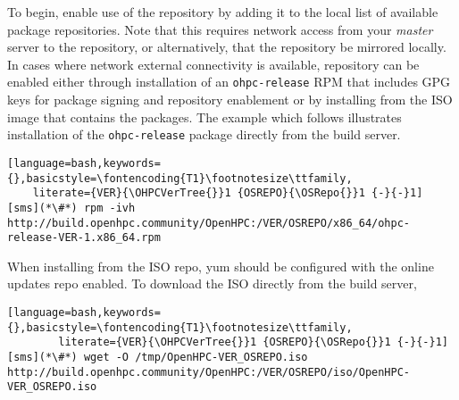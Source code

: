 To begin, enable use of the \OHPC{} repository by adding it to the local list
of available package repositories. Note that this requires network access from
your {\em master} server to the \OHPC{} repository, or alternatively, that
the \OHPC{} repository be mirrored locally.  In cases where network external
connectivity is available, \OHPC{} repository can be enabled either through
installation of an \texttt{ohpc-release} RPM that includes GPG keys for package
signing and repository enablement or by installing from the ISO image that 
contains the \OHPC{} packages.  The example which follows illustrates 
installation of the \texttt{ohpc-release} package directly from the \OHPC{}
build server.


\begin{lstlisting}[language=bash,keywords={},basicstyle=\fontencoding{T1}\footnotesize\ttfamily,
	literate={VER}{\OHPCVerTree{}}1 {OSREPO}{\OSRepo{}}1 {-}{-}1]
[sms](*\#*) rpm -ivh http://build.openhpc.community/OpenHPC:/VER/OSREPO/x86_64/ohpc-release-VER-1.x86_64.rpm
\end{lstlisting}


When installing from the ISO repo, yum should be configured with the online 
\OHPC{} updates repo enabled.  To download the ISO directly from the \OHPC{} 
build server,


\begin{lstlisting}[language=bash,keywords={},basicstyle=\fontencoding{T1}\footnotesize\ttfamily,
        literate={VER}{\OHPCVerTree{}}1 {OSREPO}{\OSRepo{}}1 {-}{-}1]
[sms](*\#*) wget -O /tmp/OpenHPC-VER_OSREPO.iso http://build.openhpc.community/OpenHPC:/VER/OSREPO/iso/OpenHPC-VER_OSREPO.iso
\end{lstlisting}

